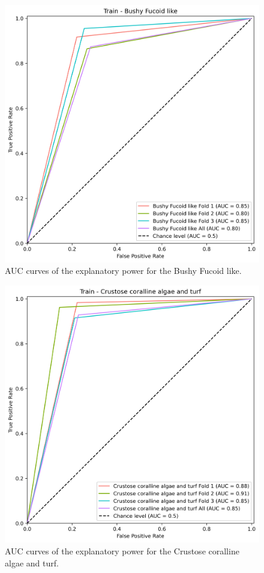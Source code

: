 \begin{figure}
\hypertarget{fig:chap3figS10}{%
\centering
\includegraphics{03-Chapitre3/figures/supplementary/03-receiver_operator_curve_train_rf_Bushy Fucoid like.png}
\caption{AUC curves of the explanatory power for the Bushy Fucoid
like.}\label{fig:chap3figS10}
}
\end{figure}

\begin{figure}
\hypertarget{fig:chap3figS11}{%
\centering
\includegraphics{03-Chapitre3/figures/supplementary/03-receiver_operator_curve_train_rf_Crustose coralline algae and turf.png}
\caption{AUC curves of the explanatory power for the Crustose coralline
algae and turf.}\label{fig:chap3figS11}
}
\end{figure}

